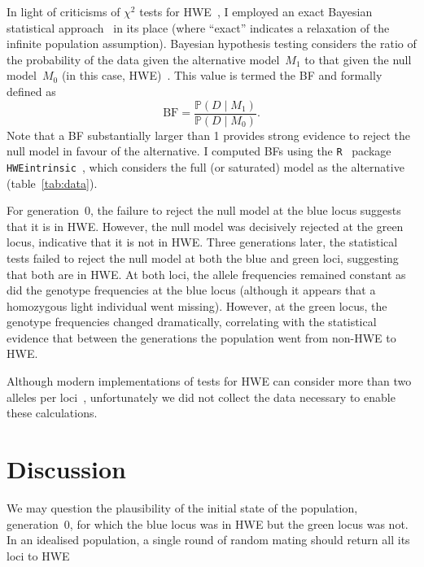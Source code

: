 \documentclass{article}
\begin{document}
    In light of criticisms of $\chi^2$ tests for \ac{HWE}~\cite{WCA05},
        I employed an exact Bayesian statistical approach~\cite{CMV11} in its
        place (where \enquote{exact} indicates a relaxation of the infinite
        population assumption).
    Bayesian hypothesis testing considers the ratio of the probability of the
        data given the alternative model~$M_1$ to that given the null
        model~$M_0$ (in this case, \ac{HWE})~\cite{Wak10}.
    This value is termed the \ac{BF} and formally defined as
    \begin{equation}
        \text{BF} = \frac{\mathbb{P}\left(D\mid M_1\right)}
                         {\mathbb{P}\left(D\mid M_0\right)}.
    \end{equation}
    Note that a \ac{BF} substantially larger than 1 provides strong evidence
        to reject the null model in favour of the alternative.
    I computed \ac{BF}s using the \texttt{R}~\cite{RCT14} package
        \texttt{HWEintrinsic}~\cite{Ven12}, which considers the full (or
        saturated) model as the alternative~\cite{CMV11}
        (table~\ref{tab:data}).

    For generation~0, the failure to reject the null model at the blue locus
        suggests that it is in \ac{HWE}. However, the null model was decisively
        rejected at the green locus, indicative that it is not in \ac{HWE}.
    Three generations later, the statistical tests failed to reject the null
        model at both the blue and green loci, suggesting that both are in
        \ac{HWE}.
    At both loci, the allele frequencies remained constant as did the genotype
        frequencies at the blue locus (although it appears that a homozygous
        light individual went missing).
    However, at the green locus, the genotype frequencies changed dramatically,
        correlating with the statistical evidence that between the generations
        the population went from non-\ac{HWE} to \ac{HWE}.

    Although modern implementations of tests for \ac{HWE} can consider more
        than two alleles per loci~\cite{Wak10}, unfortunately we did not
        collect the data necessary to enable these calculations.

    \section*{Discussion}



        We may question the plausibility of the initial state of the
            population, generation~0, for which the blue locus was in
            \ac{HWE} but the green locus was not.
        In an idealised population, a single round of random mating should
            return all its loci to \ac{HWE}
\end{document}
